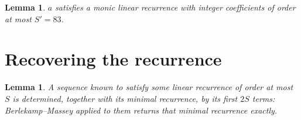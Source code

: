 \documentclass[11pt,a4paper]{article}
\theoremstyle{plain}
\newtheorem{lemma}[theorem]{Lemma}
\theoremstyle{definition}
\begin{document}
\begin{lemma}\label{lem:cf}
$a$ satisfies a monic linear recurrence with integer coefficients of order at most
$S'=83$.
\end{lemma}

\section{Recovering the recurrence}

\begin{lemma}\label{lem:bm}
A sequence known to satisfy some linear recurrence of order at most $S$ is determined, together
with its minimal recurrence, by its first $2S$ terms: Berlekamp--Massey applied to them returns
that minimal recurrence exactly.
\end{lemma}
\end{document}
